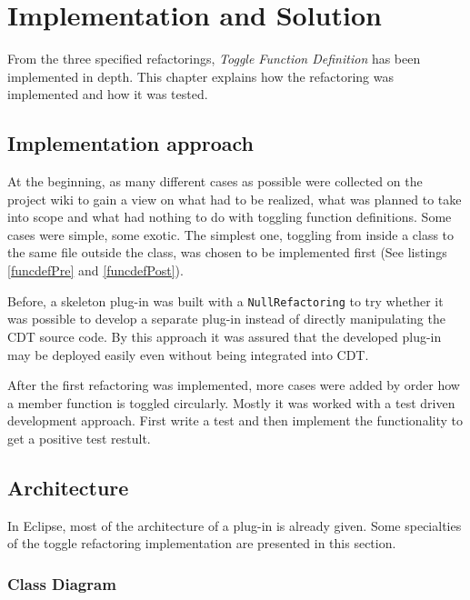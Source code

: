 \chapter{Implementation and Solution}
\thispagestyle{fancy}

From the three specified refactorings, \textit{Toggle Function Definition} has 
been implemented in depth. This chapter explains how the refactoring was 
implemented and how it was tested.

\section{Implementation approach}

At the beginning, as many different cases as possible were collected on the
project wiki to gain a view on what had to be realized, what was planned to take
into scope and what had nothing to do with toggling function definitions. Some
cases were simple, some exotic. The simplest one, toggling from inside a class
to the same file outside the class, was chosen to be implemented first (See
listings \ref{funcdefPre} and \ref{funcdefPost}). 

Before, a skeleton plug-in was built with a \texttt{NullRefactoring} to try
whether it was possible to develop a separate plug-in instead of directly
manipulating the CDT source code. By this approach it was assured that the
developed plug-in may be deployed easily even without being integrated into CDT.

After the first refactoring was implemented, more cases were added by order how
a member function is toggled circularly. Mostly it was worked with a test
driven development approach. First write a test and then implement the
functionality to get a positive test restult.

\section{Architecture}

In Eclipse, most of the architecture of a plug-in is already given. Some
specialties of the toggle refactoring implementation are presented in this
section.

\subsection{Class Diagram}

